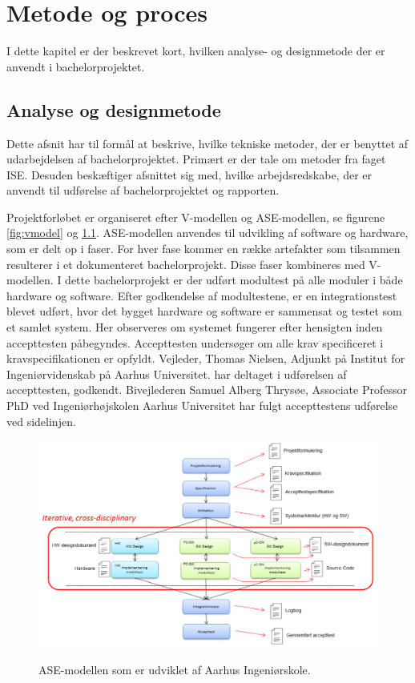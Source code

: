 \chapter{Metode og proces}

I dette kapitel er der beskrevet kort, hvilken analyse- og designmetode der er anvendt i bachelorprojektet. 

\section{Analyse og designmetode}

Dette afsnit har til formål at beskrive, hvilke tekniske metoder, der er benyttet af udarbejdelsen af bachelorprojektet. Primært er der tale om metoder fra faget ISE. Desuden beskæftiger afsnittet sig med, hvilke arbejdsredskabe, der er anvendt til udførelse af bachelorprojektet og rapporten.

Projektforløbet er organiseret efter V-modellen og ASE-modellen, se figurene \ref{fig:vmodel} og \ref{fig:asemodel}. ASE-modellen anvendes til udvikling af software og hardware, som er delt op i faser. For hver fase kommer en række artefakter som tilsammen resulterer i et dokumenteret bachelorprojekt. Disse faser kombineres med V-modellen. I dette bachelorprojekt er der udført modultest på alle moduler i både hardware og software. Efter godkendelse af modultestene, er en integrationstest blevet udført, hvor det bygget hardware og software er sammensat og testet som et samlet system. Her observeres om systemet fungerer efter hensigten inden accepttesten påbegyndes. Accepttesten undersøger om alle krav specificeret i kravspecifikationen er opfyldt. Vejleder, Thomas Nielsen, Adjunkt på Institut for Ingeniørvidenskab på Aarhus Universitet. har deltaget i udførelsen af accepttesten, godkendt. Bivejlederen Samuel Alberg Thrysøe, Associate Professor PhD ved Ingeniørhøjskolen Aarhus Universitet har fulgt accepttestens udførelse ved sidelinjen.  

\begin{figure}[H]
\centering
{\includegraphics[width=12cm]
{Figure/asemodel}}
\caption{ASE-modellen som er udviklet af Aarhus Ingeniørskole\cite{IngeniorhojskolenAarhusUniversiteta}.}
\label{fig:asemodel}
\end{figure}

